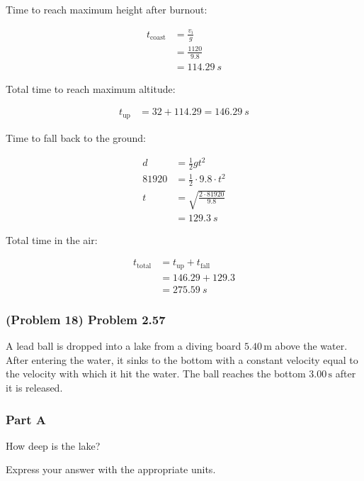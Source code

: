 \begin{solution}
	Time to reach maximum height after burnout:

	\begin{align*}
		t_{\mathrm{coast}} &= \frac{v_i}{g} \\
		&= \frac{1120}{9.8} \\
		&= \SI{114.29}{s}
	\end{align*}

	Total time to reach maximum altitude:

	\begin{align*}
		t_{\mathrm{up}} &= 32 + 114.29 = \SI{146.29}{s}
	\end{align*}

	Time to fall back to the ground:

	\begin{align*}
		d &= \frac{1}{2} g t^2 \\
		81920 &= \frac{1}{2} \cdot 9.8 \cdot t^2 \\
		t &= \sqrt{\frac{2 \cdot 81920}{9.8}} \\
		&= \SI{129.3}{s}
	\end{align*}

	Total time in the air:

	\begin{align*}
		t_{\mathrm{total}} &= t_{\mathrm{up}} + t_{\mathrm{fall}} \\
		&= 146.29 + 129.3 \\
		&= \boxed{\SI{275.59}{s}}
	\end{align*}
\end{solution}

\newpage

\subsubsection{(Problem 18) Problem 2.57}

A lead ball is dropped into a lake from a diving board \( 5.40 \, \mathrm{m} \) above the water. After entering the water, it sinks to the bottom with a constant velocity equal to the velocity with which it hit the water. The ball reaches the bottom \( 3.00 \, \mathrm{s} \) after it is released.

\subsubsection{Part A}
How deep is the lake?

Express your answer with the appropriate units.

